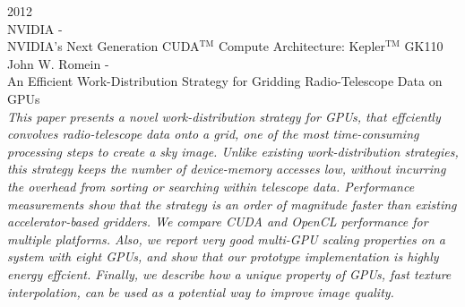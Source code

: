 \noindent
{\large 2012}\\
\noindent
{\large NVIDIA - \hfill \\
NVIDIA’s Next Generation
CUDA$^{\textrm{TM}}$ Compute Architecture: Kepler$^{\textrm{TM}}$ GK110}\\


\noindent
{\large John W. Romein - \hfill \\ An Efficient Work-Distribution Strategy for Gridding Radio-Telescope Data on GPUs }\\
\indent \textit{This paper presents a novel work-distribution strategy for GPUs, that effciently convolves radio-telescope data onto a grid, one of the most time-consuming processing steps to
create a sky image. Unlike existing work-distribution strategies, this strategy keeps the number of device-memory accesses low, without incurring the overhead from sorting or searching within telescope data. Performance measurements show that the strategy is an order of magnitude faster than
existing accelerator-based gridders. We compare CUDA and OpenCL performance for multiple platforms. Also, we report very good multi-GPU scaling properties on a system with eight GPUs, and show that our prototype implementation is highly energy effcient. Finally, we describe how a unique property of GPUs, fast texture interpolation, can be used as a potential way to improve image quality.
}\\

